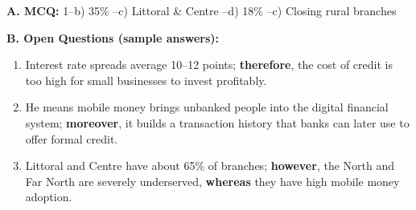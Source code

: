 \documentclass[11pt]{article}
\begin{document}
\begin{corrige}
\textbf{A. MCQ:} 1--b) 35\% --c) Littoral \& Centre --d) 18\% --c) Closing rural branches

\textbf{B. Open Questions (sample answers):}
\begin{enumerate}
\item Interest rate spreads average 10--12 points; \textbf{therefore}, the cost of credit is too high for small businesses to invest profitably.
\item He means mobile money brings unbanked people into the digital financial system; \textbf{moreover}, it builds a transaction history that banks can later use to offer formal credit.
\item Littoral and Centre have about 65\% of branches; \textbf{however}, the North and Far North are severely underserved, \textbf{whereas} they have high mobile money adoption.
\end{enumerate}
\end{corrige}
\end{document}
